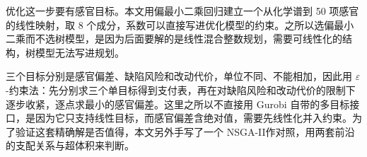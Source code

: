 优化这一步要有感官目标。本文用偏最小二乘回归\cite{wold2001}建立一个从化学谱到 50 项感官的线性映射，取 8 个成分，系数可以直接写进优化模型的约束。之所以选偏最小二乘而不选树模型，是因为后面要解的是线性混合整数规划，需要可线性化的结构，树模型无法写进规划。

三个目标分别是感官偏差、缺陷风险和改动代价，单位不同、不能相加，因此用 $\varepsilon$-约束法\cite{mavrotas2009}：先分别求三个单目标得到支付表，再在对缺陷风险和改动代价的限制下逐步收紧，逐点求最小的感官偏差。这里之所以不直接用 Gurobi 自带的多目标接口，是因为它只支持线性目标，而感官偏差含绝对值，需要先线性化并入约束。为了验证这套精确解是否值得，本文另外手写了一个 NSGA-II\cite{deb2002}作对照，用两套前沿的支配关系与超体积来判断。
